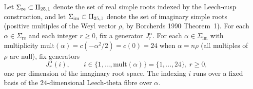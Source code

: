 \begin{definition}
\label{def:fm-J-generators}
Let $\Sigma_{\mathrm{re}} \subset \mathrm{II}_{25,1}$ denote the set of real simple roots indexed by the Leech-cusp construction, and let $\Sigma_{\mathrm{im}} \subset \mathrm{II}_{25,1}$ denote the set of imaginary simple roots (positive multiples of the Weyl vector $\rho$, by Borcherds 1990 Theorem~1). For each $\alpha \in \Sigma_{\mathrm{re}}$ and each integer $r \geq 0$, fix a generator $J^\alpha_r$. For each $\alpha \in \Sigma_{\mathrm{im}}$ with multiplicity $\mathrm{mult}(\alpha) = c(-\alpha^2/2) = c(0) = 24$ when $\alpha = n\rho$ (all multiples of $\rho$ are null), fix generators
\[
 J^\alpha_r(i), \qquad i \in \{1, \ldots, \mathrm{mult}(\alpha)\} = \{1, \ldots, 24\},\ r \geq 0,
\]
one per dimension of the imaginary root space. The indexing $i$ runs over a fixed basis of the $24$-dimensional Leech-theta fibre over $\alpha$.
\end{definition}

